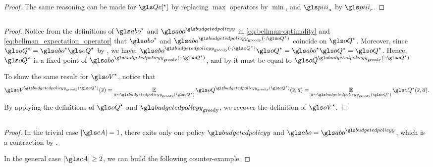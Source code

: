 \begin{subappendices}
\begin{proof}
    The same reasoning can be made for $\Qc[^\star]$ by replacing $\max$ operators by $\min$, and $\policies_a$ by $\policies_r$.
\end{proof}


\subsection{}
\begin{proof}
    Notice from the definitions of $\abo^{\star}$ and $\abo^{\budgetedpolicy}$ in \eqref{eq:bellman-optimality} and \eqref{eq:bellman_expectation_operator} that $\abo^{\star}$ and $\abo^{\budgetedpolicy_\text{greedy}(\cdot;\oQ^{\star})}$ coincide on $\oQ^{\star}$. Moreover, since $\oQ^{\star} = \abo^{\star}\oQ^{\star}$ by , we have: $\abo^{\budgetedpolicy_\text{greedy}(\cdot;\oQ^{\star})} \oQ^{\star} = \abo^{\star} \oQ^{\star} = \oQ^{\star}$.
    Hence, $\oQ^{\star}$ is a fixed point of $\abo^{\budgetedpolicy_\text{greedy}(\cdot;\oQ^{\star})}$, and by  it must be equal to $\oQ^{\budgetedpolicy_\text{greedy}(\cdot;\oQ^{\star})}$

    To show the same result for $\oV^{\star}$, notice that
    \begin{equation*}
        \oV^{\budgetedpolicy_\text{greedy}(\oQ^{\star})}(\os) = \expectedvalueover{\oa\sim\budgetedpolicy_\text{greedy}(\oQ^{\star})}\oQ^{\budgetedpolicy_\text{greedy}(\oQ^{\star})}(\os,\oa) = \expectedvalueover{\oa\sim\budgetedpolicy_\text{greedy}(\oQ^{\star})}\oQ^{\star}(\os,\oa).
    \end{equation*}
    By applying the definitions of $\oQ^{\star}$ and $\budgetedpolicy_\text{greedy}$, we recover the definition of $\oV^{\star}$.
\end{proof}

\subsection{}
\label{sec:proof_contraction}
\begin{proof}
	In the trivial case $|\cA| = 1$, there exits only one policy $\budgetedpolicy$ and $\abo = \abo^\budgetedpolicy$, which is a contraction by .
	
	In the general case $|\cA| \geq 2$, we can build the following counter-example.
	

\end{proof}
\end{subappendices}
